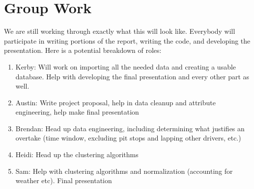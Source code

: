 \documentclass{article}
\begin{document}
\section{Group Work}
We are still working through exactly what this will look like. Everybody will participate in writing portions of the report, writing the code, and developing the presentation. Here is a potential breakdown of roles:
\begin{enumerate}[itemsep=0.25em]
    \item Kerby: Will work on importing all the needed data and creating a usable database. Help with developing the final presentation and every other part as well.
    \item Austin: Write project proposal, help in data cleanup and attribute engineering, help make final presentation
    \item Brendan: Head up data engineering, including determining what justifies an overtake (time window, excluding pit stops and lapping other drivers, etc.)
    \item Heidi: Head up the clustering algorithms 
    \item Sam: Help with clustering algorithms and normalization (accounting for weather etc). Final presentation
    
    
\end{enumerate}
\end{document}
